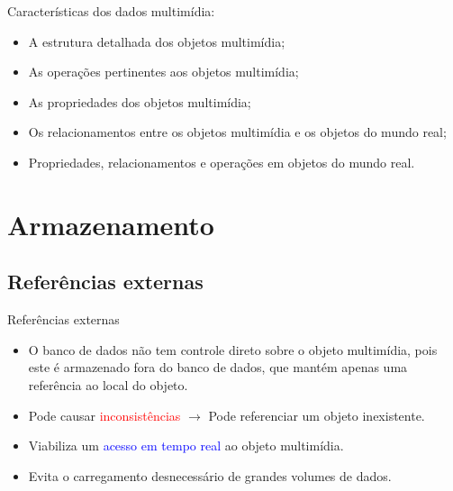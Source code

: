 \documentclass{beamer}
\begin{document}
        \begin{frame}{Características dos dados multimídia:}

        \begin{itemize}
            \item A estrutura detalhada dos objetos multimídia;
            \item As operações pertinentes aos objetos multimídia; 
            \item As propriedades dos objetos multimídia;
            \item Os relacionamentos entre os objetos multimídia e os objetos do mundo real;
            \item Propriedades, relacionamentos e operações em objetos do mundo real.
            \end{itemize}
        \end{frame}
        
\section{Armazenamento}
    \subsection{Referências externas}
        \begin{frame}{Referências externas}
            \begin{itemize}
                \item O banco de dados não tem controle direto sobre o objeto multimídia, pois este é armazenado fora do banco de dados, que mantém apenas uma referência ao local do objeto.
               \pause \item Pode causar \textcolor{red}{inconsistências} \pause $\rightarrow$ Pode referenciar um objeto inexistente. 
               \pause \item Viabiliza um \textcolor{blue}{acesso em tempo real} ao objeto multimídia.
               \pause \item Evita o carregamento desnecessário de grandes volumes de dados.
            \end{itemize}
        \end{frame}
\end{document}
